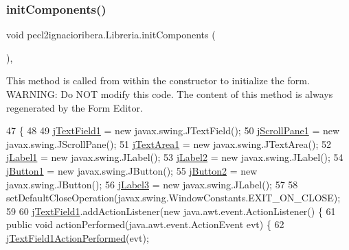 \subsubsection{\texorpdfstring{init\+Components()}{initComponents()}}
{\footnotesize\ttfamily void pecl2ignacioribera.\+Libreria.\+init\+Components (\begin{DoxyParamCaption}{ }\end{DoxyParamCaption})\hspace{0.3cm}{\ttfamily [inline]}, {\ttfamily [private]}}

This method is called from within the constructor to initialize the form. W\+A\+R\+N\+I\+NG\+: Do N\+OT modify this code. The content of this method is always regenerated by the Form Editor. 
\begin{DoxyCode}
47                                   \{
48 
49         \mbox{\hyperlink{classpecl2ignacioribera_1_1_libreria_a52881904469d52cd74871578aa7a6a87}{jTextField1}} = \textcolor{keyword}{new} javax.swing.JTextField();
50         \mbox{\hyperlink{classpecl2ignacioribera_1_1_libreria_aae2f0b8fdb27291df13ef48000cf977a}{jScrollPane1}} = \textcolor{keyword}{new} javax.swing.JScrollPane();
51         \mbox{\hyperlink{classpecl2ignacioribera_1_1_libreria_ab9a6d7b400f0ea551dabc5a36c1caebf}{jTextArea1}} = \textcolor{keyword}{new} javax.swing.JTextArea();
52         \mbox{\hyperlink{classpecl2ignacioribera_1_1_libreria_a157484d22a442a3a7ad766b199664464}{jLabel1}} = \textcolor{keyword}{new} javax.swing.JLabel();
53         \mbox{\hyperlink{classpecl2ignacioribera_1_1_libreria_ae67eba9f888cfa9d81bf5823148df302}{jLabel2}} = \textcolor{keyword}{new} javax.swing.JLabel();
54         \mbox{\hyperlink{classpecl2ignacioribera_1_1_libreria_a50c2a801f0096a4409e9348d6df5cd09}{jButton1}} = \textcolor{keyword}{new} javax.swing.JButton();
55         \mbox{\hyperlink{classpecl2ignacioribera_1_1_libreria_a56f076c83a5c4630f48f3f6ccc764d90}{jButton2}} = \textcolor{keyword}{new} javax.swing.JButton();
56         \mbox{\hyperlink{classpecl2ignacioribera_1_1_libreria_ad4888d81e2513361bb8f3e6c3cb6c7b2}{jLabel3}} = \textcolor{keyword}{new} javax.swing.JLabel();
57 
58         setDefaultCloseOperation(javax.swing.WindowConstants.EXIT\_ON\_CLOSE);
59 
60         \mbox{\hyperlink{classpecl2ignacioribera_1_1_libreria_a52881904469d52cd74871578aa7a6a87}{jTextField1}}.addActionListener(\textcolor{keyword}{new} java.awt.event.ActionListener() \{
61             \textcolor{keyword}{public} \textcolor{keywordtype}{void} actionPerformed(java.awt.event.ActionEvent evt) \{
62                 \mbox{\hyperlink{classpecl2ignacioribera_1_1_libreria_a31071a27ba4d6f5ff758be176fc744f1}{jTextField1ActionPerformed}}(evt);

\end{DoxyCode}
